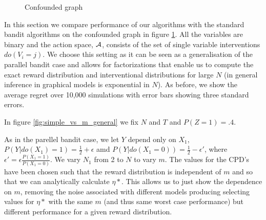 
\begin{figure}
	\centering    
        \caption{Confounded graph}
        \label{fig:parallel_confounded} 
\end{figure}


In this section we compare performance of our algorithms with the standard bandit algorithms on the confounded graph in figure \ref{fig:parallel_confounded}. All the variables are binary and the action space, $\mathcal A$, consists of the set of single variable interventions $do(V_i = j)$. We choose this setting as it can be seen as a generalisation of the parallel bandit case and allows for factorizations that enable us to compute the exact reward distribution and interventional distributions for large $N$ (in general inference in graphical models is exponential in $N$). As before, we show the average regret over 10,000 simulations with error bars showing three standard errors. 

In figure \ref{fig:simple_vs_m_general} we fix $N$ and $T$ and $P(Z=1) = .4$. 


As in the parellel bandit case, we let $Y$ depend only on $X_1$, $P(Y|do(X_1)=1) = \frac{1}{2} + \epsilon$ amd $P(Y|do(X_1=0)) = \frac{1}{2}-\epsilon'$, where $\epsilon' = \epsilon\frac{P(X_1=1)}{P(X_1=0)}$. We vary $N_1$ from 2 to $N$ to vary $m$. The values for the CPD's have been chosen such that the reward distribution is independent of $m$ and so that we can analytically calculate $\eta*$. This allows us to just show the dependence on $m$, removing the noise associated with different models producing selecting values for $\eta*$ with the same $m$ (and thus same worst case performance) but different performance for a given reward distribution. 

